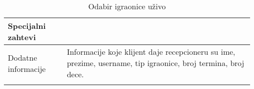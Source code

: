 \documentclass[../../main.tex]{subfiles}
\begin{document}
\begin{longtable}{| p{} | p{} |}
\\
\hline
    Specijalni zahtevi & \\
\hline
    Dodatne informacije &
     Informacije koje klijent daje recepcioneru su ime, prezime, username, tip igraonice, broj termina, broj dece.
    \\
\hline
\caption{Odabir igraonice uživo}
\end{longtable}
\end{document}
